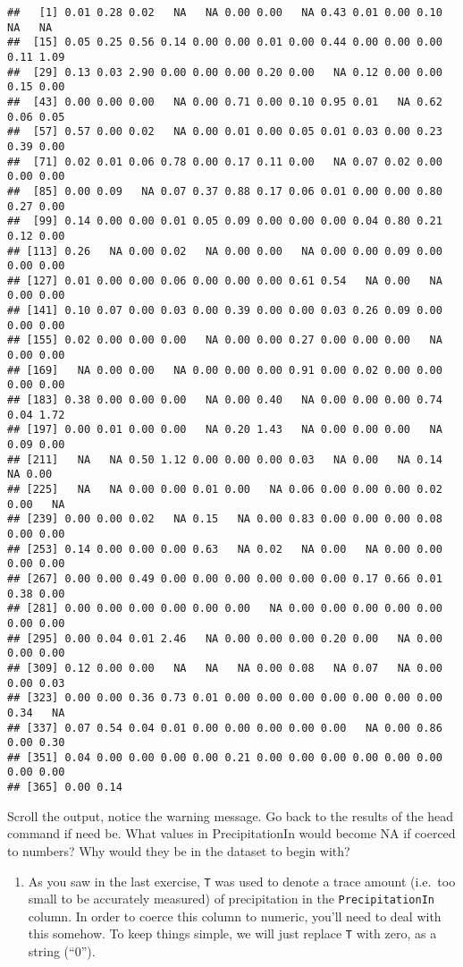 \documentclass[]{article}
\providecommand{\tightlist}{%
  \setlength{\itemsep}{0pt}\setlength{\parskip}{0pt}}
\begin{document}
\begin{verbatim}
##   [1] 0.01 0.28 0.02   NA   NA 0.00 0.00   NA 0.43 0.01 0.00 0.10   NA   NA
##  [15] 0.05 0.25 0.56 0.14 0.00 0.00 0.01 0.00 0.44 0.00 0.00 0.00 0.11 1.09
##  [29] 0.13 0.03 2.90 0.00 0.00 0.00 0.20 0.00   NA 0.12 0.00 0.00 0.15 0.00
##  [43] 0.00 0.00 0.00   NA 0.00 0.71 0.00 0.10 0.95 0.01   NA 0.62 0.06 0.05
##  [57] 0.57 0.00 0.02   NA 0.00 0.01 0.00 0.05 0.01 0.03 0.00 0.23 0.39 0.00
##  [71] 0.02 0.01 0.06 0.78 0.00 0.17 0.11 0.00   NA 0.07 0.02 0.00 0.00 0.00
##  [85] 0.00 0.09   NA 0.07 0.37 0.88 0.17 0.06 0.01 0.00 0.00 0.80 0.27 0.00
##  [99] 0.14 0.00 0.00 0.01 0.05 0.09 0.00 0.00 0.00 0.04 0.80 0.21 0.12 0.00
## [113] 0.26   NA 0.00 0.02   NA 0.00 0.00   NA 0.00 0.00 0.09 0.00 0.00 0.00
## [127] 0.01 0.00 0.00 0.06 0.00 0.00 0.00 0.61 0.54   NA 0.00   NA 0.00 0.00
## [141] 0.10 0.07 0.00 0.03 0.00 0.39 0.00 0.00 0.03 0.26 0.09 0.00 0.00 0.00
## [155] 0.02 0.00 0.00 0.00   NA 0.00 0.00 0.27 0.00 0.00 0.00   NA 0.00 0.00
## [169]   NA 0.00 0.00   NA 0.00 0.00 0.00 0.91 0.00 0.02 0.00 0.00 0.00 0.00
## [183] 0.38 0.00 0.00 0.00   NA 0.00 0.40   NA 0.00 0.00 0.00 0.74 0.04 1.72
## [197] 0.00 0.01 0.00 0.00   NA 0.20 1.43   NA 0.00 0.00 0.00   NA 0.09 0.00
## [211]   NA   NA 0.50 1.12 0.00 0.00 0.00 0.03   NA 0.00   NA 0.14   NA 0.00
## [225]   NA   NA 0.00 0.00 0.01 0.00   NA 0.06 0.00 0.00 0.00 0.02 0.00   NA
## [239] 0.00 0.00 0.02   NA 0.15   NA 0.00 0.83 0.00 0.00 0.00 0.08 0.00 0.00
## [253] 0.14 0.00 0.00 0.00 0.63   NA 0.02   NA 0.00   NA 0.00 0.00 0.00 0.00
## [267] 0.00 0.00 0.49 0.00 0.00 0.00 0.00 0.00 0.00 0.17 0.66 0.01 0.38 0.00
## [281] 0.00 0.00 0.00 0.00 0.00 0.00   NA 0.00 0.00 0.00 0.00 0.00 0.00 0.00
## [295] 0.00 0.04 0.01 2.46   NA 0.00 0.00 0.00 0.20 0.00   NA 0.00 0.00 0.00
## [309] 0.12 0.00 0.00   NA   NA   NA 0.00 0.08   NA 0.07   NA 0.00 0.00 0.03
## [323] 0.00 0.00 0.36 0.73 0.01 0.00 0.00 0.00 0.00 0.00 0.00 0.00 0.34   NA
## [337] 0.07 0.54 0.04 0.01 0.00 0.00 0.00 0.00 0.00   NA 0.00 0.86 0.00 0.30
## [351] 0.04 0.00 0.00 0.00 0.00 0.21 0.00 0.00 0.00 0.00 0.00 0.00 0.00 0.00
## [365] 0.00 0.14
\end{verbatim}

Scroll the output, notice the warning message. Go back to the results of
the head command if need be. What values in PrecipitationIn would become
NA if coerced to numbers? Why would they be in the dataset to begin
with?

\begin{enumerate}
\def\labelenumi{\arabic{enumi}.}
\setcounter{enumi}{6}
\tightlist
\item
  As you saw in the last exercise, \texttt{T} was used to denote a trace
  amount (i.e.~too small to be accurately measured) of precipitation in
  the \texttt{PrecipitationIn} column. In order to coerce this column to
  numeric, you'll need to deal with this somehow. To keep things simple,
  we will just replace \texttt{T} with zero, as a string (``0'').
\end{enumerate}
\end{document}
